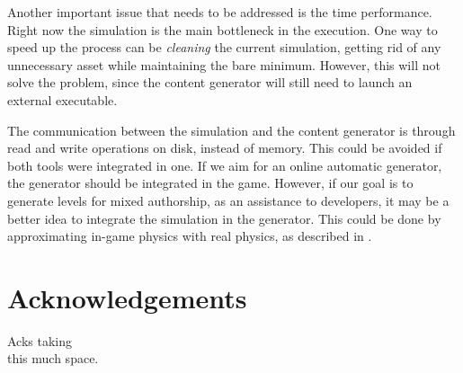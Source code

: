 \documentclass[runningheads,a4paper]{llncs}
\begin{document}
Another important issue that needs to be addressed is the time performance. 
Right now the simulation is the main bottleneck in the execution. One way to 
speed up the process can be \textit{cleaning} the current simulation, getting 
rid of any unnecessary asset while maintaining the bare minimum. However, this 
will not solve the problem, since the content generator will still need to 
launch an external executable.

The communication between the simulation and the content generator is through 
read and write operations on disk, instead of memory. This could be avoided if 
both tools were integrated in one. If we aim for an online automatic generator, 
the generator should be integrated in the game. However, if our goal is to 
generate levels for mixed authorship, as an assistance to developers, it may be 
a better idea to integrate the simulation in the generator. This could be done 
by approximating in-game physics with real physics, as described in 
\cite{blum1970stability}. 



\section*{Acknowledgements}
Acks taking\\
this much space.



\end{document}
